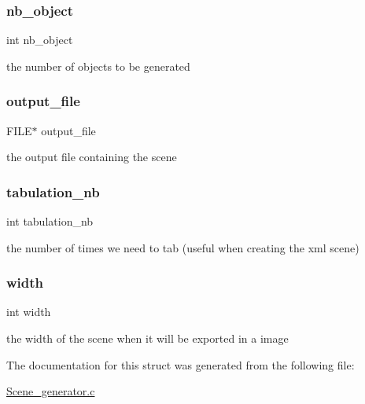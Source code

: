 \subsubsection{\texorpdfstring{nb\+\_\+object}{nb\_object}}
{\footnotesize\ttfamily int nb\+\_\+object}

the number of objects to be generated \mbox{\label{struct_scene__info_a2960eb597f48f3b59bbb850b47e895ff}} 
\subsubsection{\texorpdfstring{output\+\_\+file}{output\_file}}
{\footnotesize\ttfamily F\+I\+LE$\ast$ output\+\_\+file}

the output file containing the scene \mbox{\label{struct_scene__info_a432ce34b9fc8367bdfca15bee393de96}} 
\subsubsection{\texorpdfstring{tabulation\+\_\+nb}{tabulation\_nb}}
{\footnotesize\ttfamily int tabulation\+\_\+nb}

the number of times we need to tab (useful when creating the xml scene) \mbox{\label{struct_scene__info_a2474a5474cbff19523a51eb1de01cda4}} 
\subsubsection{\texorpdfstring{width}{width}}
{\footnotesize\ttfamily int width}

the width of the scene when it will be exported in a image 

The documentation for this struct was generated from the following file\+:\begin{DoxyCompactItemize}
\item 
\hyperlink{_scene__generator_8c}{Scene\+\_\+generator.\+c}\end{DoxyCompactItemize}
